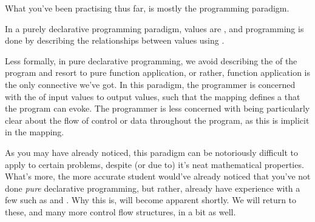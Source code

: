 What you've been practising thus far, is mostly the 
programming paradigm.

\begin{definition}

In a purely declarative programming paradigm, values are , and
programming is done by describing the relationships between values using
.

\end{definition}

Less formally, in pure declarative programming, we avoid describing the
 of the program and resort to pure function application, or rather,
function application is the only connective we've got.  In this paradigm, the
programmer is concerned with the  of input values to output
values, such that the mapping defines a  that the
program can evoke.  The programmer is less concerned with being particularly
clear about the flow of control or data throughout the program, as this is
implicit in the mapping.

As you may have already noticed, this paradigm can be notoriously difficult to
apply to certain problems, despite (or due to) it's neat mathematical
properties.  What's more, the more accurate student would've already noticed
that you've not done \emph{pure} declarative programming, but rather, already
have experience with a few  such as  and
 .  Why this is, will become
apparent shortly. We will return to these, and many more control flow
structures, in a bit as well.
